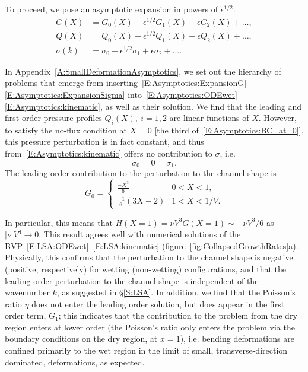 \documentclass{jfm}
\newcommand{\poisson}{\eta} %
\begin{document}
To proceed, we pose an asymptotic expansion in powers of $\epsilon^{1/2}$:
\begin{align}
G(X) &=    G_0(X) + \epsilon^{1/2} G_1(X) + \epsilon G_2(X)+ \dots,\label{E:Asymptotics:ExpansionG} \\
Q(X) &=  Q_0(X) + \epsilon^{1/2} Q_1(X) + \epsilon Q_2(X)+\dots,\label{E:Asymptotics:ExpansionQ} \\
\sigma(k) &= \sigma_0 + \epsilon^{1/2} \sigma_1 + \epsilon \sigma_2+ \dots. \label{E:Asymptotics:ExpansionSigma}
\end{align}

In Appendix~\ref{A:SmallDeformationAsymptotics}, we set out the hierarchy of problems that emerge from inserting~\eqref{E:Asymptotics:ExpansionG}--\eqref{E:Asymptotics:ExpansionSigma} into~\eqref{E:Asymptotics:ODEwet}--\eqref{E:Asymptotics:kinematic}, as well as their solution.  We find that the leading and first order pressure profiles $Q_i(X),~i = 1,2$ are linear functions of $X$. However, to satisfy the no-flux condition at $X =0$ [the third of~\eqref{E:Asymptotics:BC_at_0}], this pressure perturbation is in fact constant, and thus from~\eqref{E:Asymptotics:kinematic} offers no contribution to $\sigma$, i.e.
\begin{equation}
\sigma_{0} = 0 = \sigma_{1}.
\end{equation}
The leading order contribution to the perturbation to the channel shape is
\begin{equation}\label{E:Asymptotics:ChannelShapeSolution}
G_{0} =\begin{cases}
\frac{-X^3}{6} & 0 < X < 1,\\
\frac{-1}{6}(3X-2) & 1 < X < 1/V.
\end{cases}
\end{equation}

In particular, this means that $H(X=1) = \nu V^3 G(X=1)\sim -\nu V^3/6$ as $|\nu| V^4 \to 0$. This result agrees well with numerical solutions of the BVP~\eqref{E:LSA:ODEwet}--\eqref{E:LSA:kinematic} (figure~\ref{fig:CollapsedGrowthRates}a). Physically, this confirms that the perturbation to the channel shape is negative (positive, respectively) for wetting (non-wetting) configurations, and that the leading order perturbation to the channel shape is independent of the wavenumber $k$, as suggested in \S\ref{S:LSA}. In addition, we find that the Poisson's ratio $\poisson$ does not enter the leading order solution, but does appear in the first order term, $G_{1}$; this indicates that the contribution to the problem from the dry region enters at lower order (the Poisson's ratio only enters the problem via the boundary conditions on the dry region, at $x = 1$), i.e. bending deformations are confined primarily to the wet region in the limit of small, transverse-direction dominated, deformations, as expected.
\end{document}

